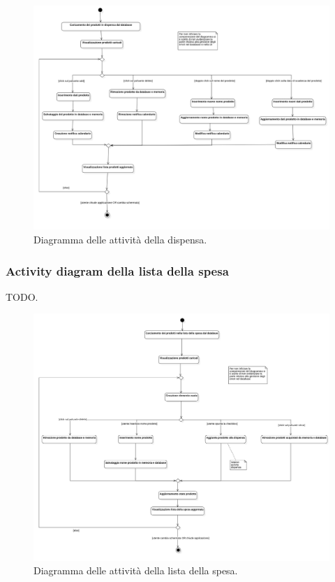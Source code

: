 \documentclass{article}
\begin{document}
\begin{figure}[H]
    \includegraphics[width=\linewidth]{images/activity-pantry.png}
    \caption{Diagramma delle attività della dispensa.}
    \label{fig:actpantry}
\end{figure}

\subsubsection{Activity diagram della lista della spesa}

TODO.

\begin{figure}[H]
    \includegraphics[width=\linewidth]{images/activity-shopping-list.png}
    \caption{Diagramma delle attività della lista della spesa.}
    \label{fig:actshoplist}
\end{figure}
\end{document}
